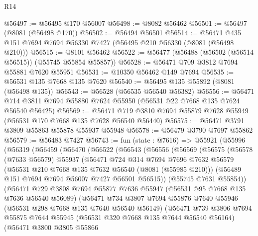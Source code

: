 \begin{lexlean}{R14}
\begin{coremodule}
@56497 := @56495 @170 @56007
@56498 := @8082 @56462
@56501 := @56497 (@8081 (@56498 @170))
@56502 := @56494 @56501
@56514 := @56471 @435 @151 @7694 @7694 @56330 @7427 (@56495 @210 @56330 (@8081 (@56498 @210)))
@56515 := @8101 @56462
@56522 := @56477 (@56488 (@56502 (@56514 @56515)) (@55745 @55854 @55857))
@56528 := @56471 @709 @3812 @7694 @55881 @7620 @55951
@56531 := @10350 @56462 @149 @7694
@56535 := @56531 @135 @7668 @135 @7620
@56540 := @56495 @135 @55892 (@8081 (@56498 @135))
@56543 := @56528 (@56535 @56540 @56382)
@56556 := @56471 @714 @3811 @7694 @55880 @7624 @55950 (@56531 @22 @7668 @135 @7624 @56540 @56425)
@56569 := @56471 @719 @3810 @7694 @55879 @7628 @55949 (@56531 @170 @7668 @135 @7628 @56540 @56440)
@56575 := @56471 @3791 @3809 @55863 @55878 @55937 @55948
@56578 := @56479 @3790 @7697 @55862
@56579 := @56483 @7427
@56743 := fun (state : @7616) =>
  @55921
    (@55996
      (@56319
        (@56459
          (@56470
            (@56522
              (@56543
                (@56556
                  (@56569
                    (@56575
                      (@56578
                        (@7633 @56579)
                        @55937
                        (@56471
                          @724
                          @314
                          @7694
                          @7696
                          @7632
                          @56579
                          (@56531 @210 @7668 @135 @7632 @56540 (@8081 (@55985 @210)))
                          (@56489 @151 @7694 @7694 @56007 @7427 @56501 @56515))
                        (@55745 @7631 @55854))
                      (@56471
                        @729
                        @3808
                        @7694
                        @55877
                        @7636
                        @55947
                        (@56531 @95 @7668 @135 @7636 @56540 @56089)
                        (@56471
                          @734
                          @3807
                          @7694
                          @55876
                          @7640
                          @55946
                          (@56531 @298 @7668 @135 @7640 @56540 @56149)
                          (@56471
                            @739
                            @3806
                            @7694
                            @55875
                            @7644
                            @55945
                            (@56531 @320 @7668 @135 @7644 @56540 @56164)
                            (@56471
                              @3800
                              @3805
                              @55866

\end{coremodule}
\end{lexlean}
